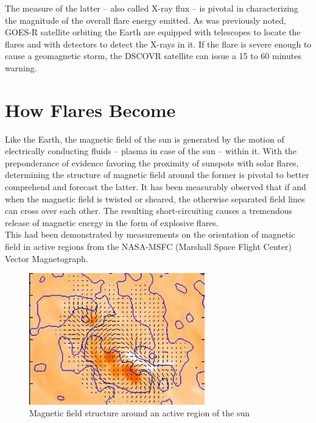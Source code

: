 \documentclass[12pt,twoside]{reedthesis}
\begin{document}
	The measure of the latter – also called X-ray flux – is pivotal in characterizing the magnitude of the overall flare energy emitted. As was previously noted, GOES-R satellite orbiting the Earth are equipped with telescopes to locate the flares and with detectors to detect the X-rays in it. If the flare is severe enough to cause a geomagnetic storm, the DSCOVR satellite can issue a 15 to 60 minutes warning. \\
	
\section{How Flares Become} 

Like the Earth, the magnetic field of the sun is generated by the motion of electrically conducting fluids – plasma in case of the sun – within it. With the preponderance of evidence favoring the proximity of sunspots with solar flares, determining the structure of magnetic field around the former is pivotal to better comprehend and forecast the latter. It has been measurably observed that if and when the magnetic field is twisted or sheared, the otherwise separated field lines can cross over each other. The resulting short-circuiting causes a tremendous release of magnetic energy in the form of explosive flares. \\

This had been demonstrated by measurements on the orientation of magnetic field in active regions from the NASA-MSFC (Marshall Space Flight Center) Vector Magnetograph.\\

\begin{figure}[htbp] %
	   \centering
	   \includegraphics[width=3in]{osf2.png} 
	   \caption{Magnetic field structure around an active region of the sun}
	\end{figure}
\end{document}
